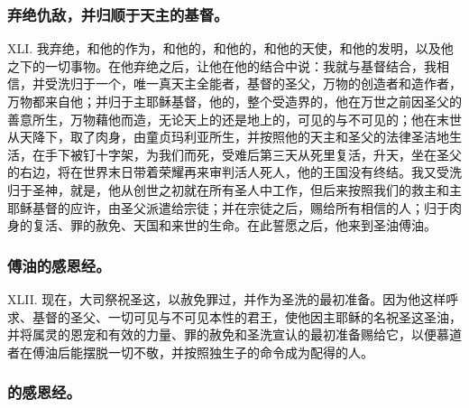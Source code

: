 \subsubsection{弃绝仇敌，并归顺于天主的基督。}

XLI. 我弃绝，和他的作为，和他的，和他的，和他的天使，和他的发明，以及他之下的一切事物。在他弃绝之后，让他在他的结合中说：我就与基督结合，我相信，并受洗归于一个，唯一真天主全能者，基督的圣父，万物的创造者和造作者，万物都来自他；并归于主耶稣基督，他的，整个受造界的，他在万世之前因圣父的善意所生，万物藉他而造，无论天上的还是地上的，可见的与不可见的；他在末世从天降下，取了肉身，由童贞玛利亚所生，并按照他的天主和圣父的法律圣洁地生活，在手下被钉十字架，为我们而死，受难后第三天从死里复活，升天，坐在圣父的右边，将在世界末日带着荣耀再来审判活人死人，他的王国没有终结。我又受洗归于圣神，就是，他从创世之初就在所有圣人中工作，但后来按照我们的救主和主耶稣基督的应许，由圣父派遣给宗徒；并在宗徒之后，赐给所有相信的人；归于肉身的复活、罪的赦免、天国和来世的生命。在此誓愿之后，他来到圣油傅油。\par


\subsubsection{傅油的感恩经。}

XLII. 现在，大司祭祝圣这，以赦免罪过，并作为圣洗的最初准备。因为他这样呼求、基督的圣父、一切可见与不可见本性的君王，使他因主耶稣的名祝圣这圣油，并将属灵的恩宠和有效的力量、罪的赦免和圣洗宣认的最初准备赐给它，以便慕道者在傅油后能摆脱一切不敬，并按照独生子的命令成为配得的人。\par


\subsubsection{的感恩经。}

